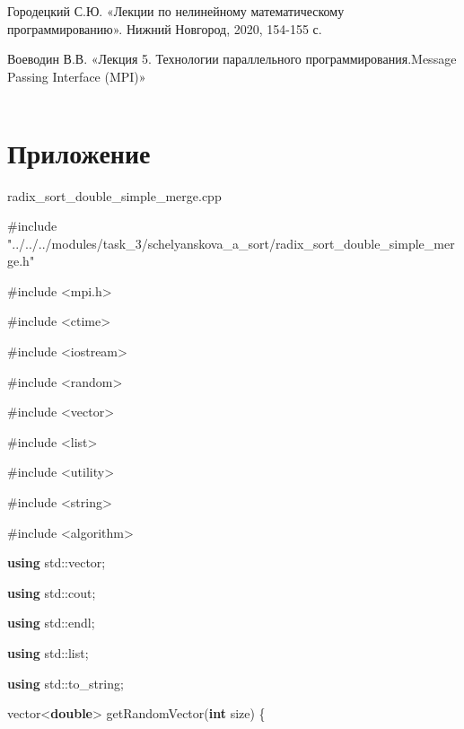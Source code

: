 \documentclass[]{article}
\begin{document}
Городецкий С.Ю. «Лекции по нелинейному математическому
программированию». Нижний Новгород, 2020, 154-155 с.

Воеводин В.В. «Лекция 5. Технологии параллельного
программирования.Message Passing Interface (MPI)»

\begin{longtable}[]{@{}ll@{}}
\toprule
&\tabularnewline
\bottomrule
\end{longtable}

\section{}\label{section-1}

\section{}\label{section-2}

\section{Приложение}\label{ux43fux440ux438ux43bux43eux436ux435ux43dux438ux435}

radix\_sort\_double\_simple\_merge.cpp

\#include
"../../../modules/task\_3/schelyanskova\_a\_sort/radix\_sort\_double\_simple\_merge.h"

\#include \textless{}mpi.h\textgreater{}

\#include \textless{}ctime\textgreater{}

\#include \textless{}iostream\textgreater{}

\#include \textless{}random\textgreater{}

\#include \textless{}vector\textgreater{}

\#include \textless{}list\textgreater{}

\#include \textless{}utility\textgreater{}

\#include \textless{}string\textgreater{}

\#include \textless{}algorithm\textgreater{}

\textbf{using} std::vector;

\textbf{using} std::cout;

\textbf{using} std::endl;

\textbf{using} std::list;

\textbf{using} std::to\_string;

vector\textless{}\textbf{double}\textgreater{}
getRandomVector(\textbf{int} size) \{
\end{document}
